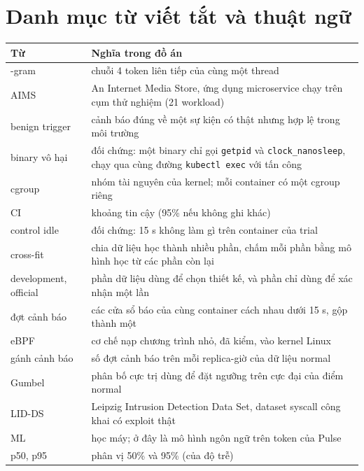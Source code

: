 \chapter*{Danh mục từ viết tắt và thuật ngữ}

\begin{longtable}[]{@{}>{\raggedright\arraybackslash}p{}>{\raggedright\arraybackslash}p{}@{}}
\toprule\noalign{}
Từ & Nghĩa trong đồ án \\
\midrule\noalign{}
\endhead
\bottomrule\noalign{}
\endlastfoot
4-gram & chuỗi 4 token liên tiếp của cùng một thread \\
AIMS & An Internet Media Store, ứng dụng microservice chạy trên cụm thử nghiệm (21 workload) \\
benign trigger & cảnh báo đúng về một sự kiện có thật nhưng hợp lệ trong môi trường \citep{alahmadi2022} \\
binary vô hại & đối chứng: một binary chỉ gọi \texttt{getpid} và \texttt{clock\_\allowbreak{}nanosleep}, chạy qua cùng đường \texttt{kubectl exec} với tấn công \\
cgroup & nhóm tài nguyên của kernel; mỗi container có một cgroup riêng \\
CI & khoảng tin cậy (95\% nếu không ghi khác) \\
control idle & đối chứng: 15 s không làm gì trên container của trial \\
cross-fit & chia dữ liệu học thành nhiều phần, chấm mỗi phần bằng mô hình học từ các phần còn lại \\
development, official & phần dữ liệu dùng để chọn thiết kế, và phần chỉ dùng để xác nhận một lần \\
đợt cảnh báo & các cửa sổ báo của cùng container cách nhau dưới 15 s, gộp thành một \\
eBPF & cơ chế nạp chương trình nhỏ, đã kiểm, vào kernel Linux \\
gánh cảnh báo & số đợt cảnh báo trên mỗi replica-giờ của dữ liệu normal \\
Gumbel & phân bố cực trị dùng để đặt ngưỡng trên cực đại của điểm normal \\
LID-DS & Leipzig Intrusion Detection Data Set, dataset syscall công khai có exploit thật \citep{grimmer2022} \\
ML & học máy; ở đây là mô hình ngôn ngữ trên token của Pulse \\
p50, p95 & phân vị 50\% và 95\% (của độ trễ) \\

\end{longtable}
